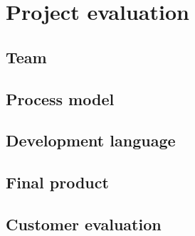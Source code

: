 \chapter{Project evaluation}

\section{Team}

\section{Process model}

\section{Development language}

\section{Final product}

\section{Customer evaluation}

